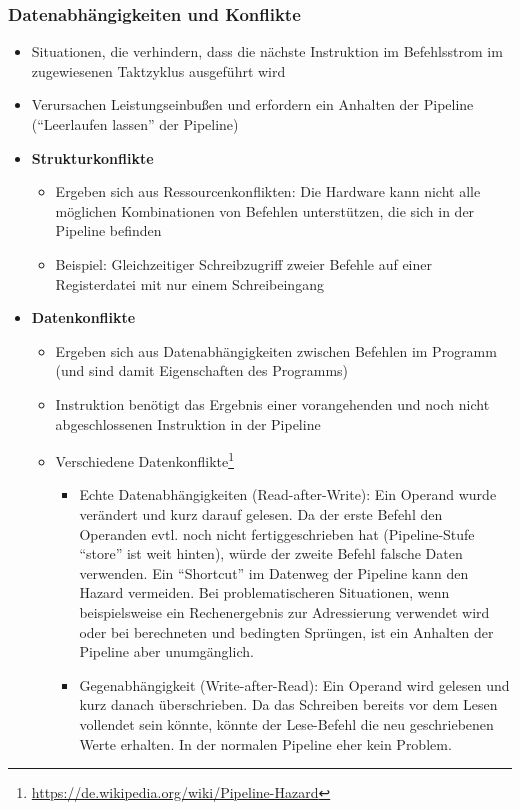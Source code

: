 \subsubsection{Datenabhängigkeiten und Konflikte}
\begin{itemize}
	\item Situationen, die verhindern, dass die nächste Instruktion im Befehlsstrom im zugewiesenen Taktzyklus ausgeführt wird
	\item Verursachen Leistungseinbußen und erfordern ein Anhalten der Pipeline ("`Leerlaufen lassen"' der Pipeline)
	\item \textbf{Strukturkonflikte}
	\begin{itemize}
		\item Ergeben sich aus Ressourcenkonflikten: Die Hardware kann nicht alle möglichen Kombinationen von Befehlen unterstützen, die sich in der Pipeline befinden
		\item Beispiel: Gleichzeitiger Schreibzugriff zweier Befehle auf einer Registerdatei mit nur einem Schreibeingang
	\end{itemize}
	\item \textbf{Datenkonflikte}
	\begin{itemize}
		\item Ergeben sich aus Datenabhängigkeiten zwischen Befehlen im Programm (und sind damit Eigenschaften des Programms)
		\item Instruktion benötigt das Ergebnis einer vorangehenden und noch nicht abgeschlossenen Instruktion in der Pipeline
		\item Verschiedene Datenkonflikte\footnote{\url{https://de.wikipedia.org/wiki/Pipeline-Hazard}}
		\begin{itemize}
			\item Echte Datenabhängigkeiten (Read-after-Write): Ein Operand wurde verändert und kurz darauf gelesen. Da der erste Befehl den Operanden evtl. noch nicht fertiggeschrieben hat (Pipeline-Stufe "`store"' ist weit hinten), würde der zweite Befehl falsche Daten verwenden. Ein "`Shortcut"' im Datenweg der Pipeline kann den Hazard vermeiden. Bei problematischeren Situationen, wenn beispielsweise ein Rechenergebnis zur Adressierung verwendet wird oder bei berechneten und bedingten Sprüngen, ist ein Anhalten der Pipeline aber unumgänglich.
			\item Gegenabhängigkeit (Write-after-Read): Ein Operand wird gelesen und kurz danach überschrieben. Da das Schreiben bereits vor dem Lesen vollendet sein könnte, könnte der Lese-Befehl die neu geschriebenen Werte erhalten. In der normalen Pipeline eher kein Problem.

\end{itemize}
\end{itemize}
\end{itemize}
